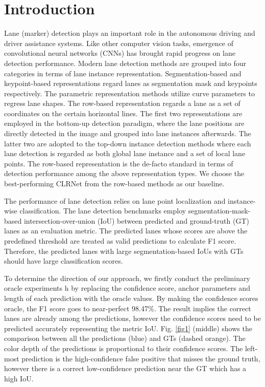 \documentclass[10pt,twocolumn,letterpaper]{article}
\begin{document}
\section{Introduction}

Lane (marker) detection plays an important role in the autonomous driving and driver assistance systems.
Like other computer vision tasks, emergence of convolutional neural networks (CNNs) has brought rapid progress on lane detection performance. 
Modern lane detection methods are grouped into four categories in terms of lane instance representation.
Segmentation-based \cite{pan2018SCNN, RESA_2021} and keypoint-based \cite{Qu_2021_CVPR} representations regard lanes as segmentation mask and keypoints respectively.
The parametric representation methods \cite{TorresBPBSO20, LSTR} utilize curve parameters to regress lane shapes. 
The row-based representation \cite{tabelini2021cvpr, Zheng_2022_CVPR, qin2020ultra, qin2022ultrav2, Liu_2021_ICCV} regards a lane as a set of coordinates on the certain horizontal lines. 
The first two representations are employed in the bottom-up detection paradigm, where the lane positions are directly detected in the image and grouped into lane instances afterwards. The latter two are adopted to the top-down instance detection methods where each lane detection is regarded as both global lane instance and a set of local lane points.
The row-based representation is the de-facto standard in terms of detection performance among the above representation types.
We choose the best-performing CLRNet \cite{Zheng_2022_CVPR} from the row-based methods as our baseline.

The performance of lane detection relies on lane point localization and instance-wise classification. 
The lane detection benchmarks \cite{pan2018SCNN, CurveLane-NAS} employ segmentation-mask-based intersection-over-union (IoU) between predicted and ground-truth (GT) lanes as an evaluation metric.
The predicted lanes whose scores are above the predefined threshold are treated as valid predictions to calculate F1 score.
Therefore, the predicted lanes with large segmentation-based IoUs with GTs should have large classification scores. 

To determine the direction of our approach, we firstly conduct the preliminary oracle experiments h by replacing the confidence score, anchor parameters and length of each prediction with the oracle values.
By making the confidence scores oracle, the F1 score goes to near-perfect 98.47\%.
The result implies the correct lanes are already among the predictions, however the confidence scores need to be predicted accurately representing the metric IoU.
Fig. \ref{fig1} (middle) shows the comparison between all the predictions (blue) and GTs (dashed orange). The color depth of the predictions is proportional to their confidence scores. 
The left-most prediction is the high-confidence false positive that misses the ground truth, however there is a correct low-confidence prediction near the GT which has a high IoU.
\end{document}
